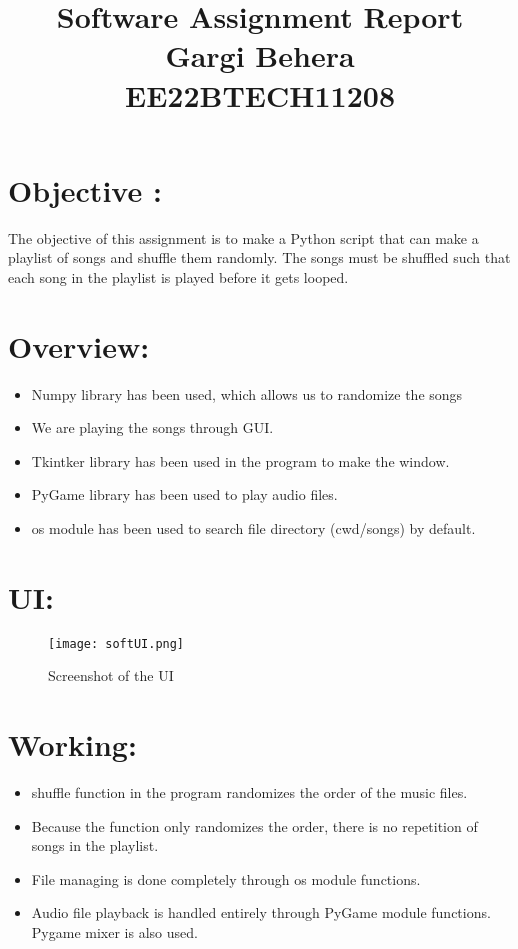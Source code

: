 \documentclass{article}
\begin{document}
\title{Software Assignment Report\\ \large{Gargi Behera\\EE22BTECH11208}}
\author{}
\date{}
\maketitle

\maketitle

\section*{Objective :}
The objective of this assignment is to make a Python script that can make a playlist of songs and shuffle them randomly. The songs must be shuffled such that each song in the playlist is played before it gets looped.

\section*{Overview:}
\begin{itemize}
    \item Numpy library has been used, which allows us to randomize the songs
    \item We are playing the songs through GUI.
    \item Tkintker library has been used in the program to make the window.
    \item PyGame library has been used to play audio files.
    \item os module has been used to search file directory (cwd/songs) by default.
\end{itemize}

\section*{UI:}
\begin{figure}[ht]
	\centering
	\texttt{[image: softUI.png]}
	\caption{Screenshot of the UI}
	\label{fig:view}
\end{figure}
\FloatBarrier

\section*{Working:}
\begin{itemize}
    \item shuffle function in the program randomizes the order of the music files.
    \item Because the function only randomizes the order, there is no repetition of songs in the playlist.
    \item File managing is done completely through os module functions.
    \item Audio file playback is handled entirely through PyGame module functions. Pygame mixer is also used.
\end{itemize}
\end{document}
